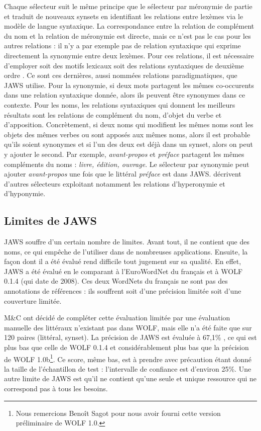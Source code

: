 Chaque sélecteur suit le même principe que le sélecteur par méronymie de partie et traduit de nouveaux synsets en identifiant les relations entre lexèmes via le modèle de langue syntaxique. La correspondance entre la relation de complément du nom et la relation de méronymie est directe, mais ce n'est pas le cas pour les autres relations : il n'y a par exemple pas de relation syntaxique qui exprime directement la synonymie entre deux lexèmes. Pour ces relations, il est nécessaire d'employer soit des motifs lexicaux \citep{hearst1992automatic} soit des relations syntaxiques de deuxième ordre \citep{lenci2012identifying}. Ce sont ces dernières, aussi nommées relations paradigmatiques, que JAWS utilise. Pour la synonymie, si deux mots partagent les mêmes co-occurents dans une relation syntaxique donnée, alors ils peuvent être synonymes dans ce contexte. Pour les noms, les relations syntaxiques qui donnent les meilleurs résultats sont les relations de complément du nom, d'objet du verbe et d'apposition. Concrètement, si deux noms qui modifient les mêmes noms sont les objets des mêmes verbes ou sont apposés aux mêmes noms, alors il est probable qu'ils soient synonymes et si l'un des deux est déjà dans un synset, alors on peut y ajouter le second. Par exemple, \textit{avant-propos} et \textit{préface} partagent les mêmes compléments du noms : \textit{livre, édition, ouvrage}. Le sélecteur par synonymie peut ajouter \textit{avant-propos} une fois que le littéral \textit{préface} est dans JAWS. \citep{mouton2010jaws,mouton2010phd} décrivent d'autres sélecteurs exploitant notamment les relations d'hyperonymie et d'hyponymie.

\subsection{Limites de JAWS}
\label{subsec:limitations}

JAWS souffre d'un certain nombre de limites. Avant tout, il ne contient que des noms, ce qui empêche de l'utiliser dans de nombreuses applications. Ensuite, la façon dont il a été évalué rend difficile tout jugement sur sa qualité. En effet, JAWS a été évalué en le comparant à l'EuroWordNet du français et à WOLF 0.1.4 (qui date de 2008). Ces deux WordNets du français ne sont pas des annotations de références : ils souffrent soit d'une précision limitée soit d'une couverture limitée.

M\&C ont décidé de compléter cette évaluation limitée par une évaluation manuelle des littéraux n'existant pas dans WOLF, mais elle n'a été faite que sur 120 paires (littéral, synset). La précision de JAWS est évaluée à 67,1\% \citep{mouton2010phd}, ce qui est plus bas que celle de WOLF 0.1.4 et considérablement plus bas que la précision de WOLF 1.0b\footnote{Nous remercions Benoît Sagot pour nous avoir fourni cette version préliminaire de WOLF 1.0.}. Ce score, même bas, est à prendre avec précaution étant donné la taille de l'échantillon de test : l'intervalle de confiance est d'environ 25\%. Une autre limite de JAWS est qu'il ne contient qu'une seule et unique ressource qui ne correspond pas à tous les besoins.

